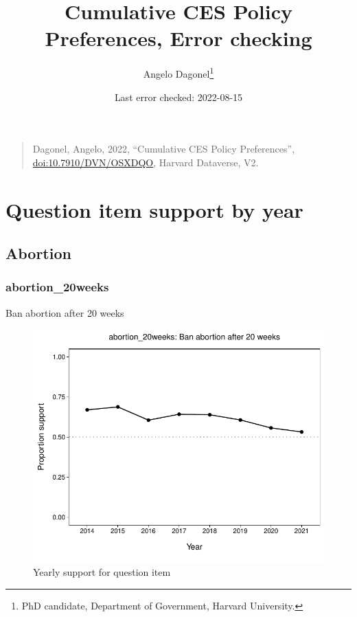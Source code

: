 \documentclass[
  12pt]{article}
\title{\Large Cumulative CES Policy Preferences, Error checking}
\author{Angelo Dagonel\footnote{PhD candidate, Department of Government,
  Harvard University.}}
\date{Last error checked: 2022-08-15}
\begin{document}
\maketitle

\begin{quote}
Dagonel, Angelo, 2022, ``Cumulative CES Policy Preferences'',
\href{https://dataverse.harvard.edu/dataset.xhtml?persistentId=doi:10.7910/DVN/OSXDQO}{\url{doi:10.7910/DVN/OSXDQO}},
Harvard Dataverse, V2.
\end{quote}

\bigskip

\hypertarget{question-item-support-by-year}{%
\section{Question item support by
year}\label{question-item-support-by-year}}

\hypertarget{abortion}{%
\subsection{Abortion}\label{abortion}}

\hypertarget{abortion_20weeks}{%
\subsubsection{abortion\_20weeks}\label{abortion_20weeks}}

Ban abortion after 20 weeks

\begin{figure}

{\centering \includegraphics{error-checking_files/figure-latex/unnamed-chunk-3-1} 

}

\caption{Yearly support for question item}\label{fig:unnamed-chunk-3-1}
\end{figure}
\end{document}
